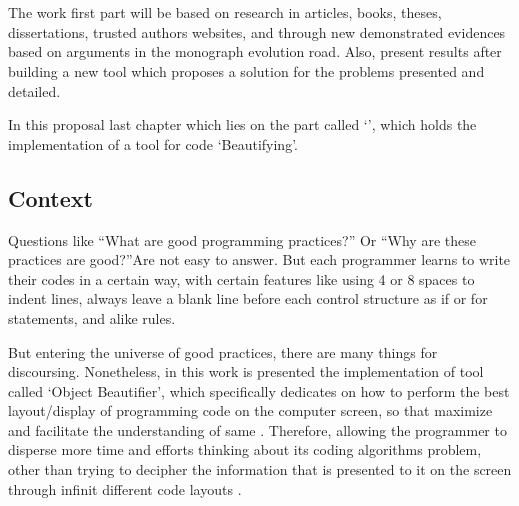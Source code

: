 

%


\chapter{}

    The work first part will be based on research in
    articles, books, theses, dissertations, trusted authors websites,
    and through new demonstrated evidences based on arguments
    in the monograph evolution road.
    Also, present results after building a new tool
    which proposes a solution for the problems presented and detailed.

    In this proposal last chapter which lies on the part
    called `', which holds the implementation of a
    tool for code `Beautifying'.



    \section{Context}

    Questions like ``What are good programming practices?'' Or ``Why are these
    practices are good?''Are not easy to answer. But each programmer learns to
    write their codes in a certain way, with certain features like using 4 or 8
    spaces to indent lines, always leave a blank line before each control
    structure as if or for statements, and alike rules.
    \cite{naturalCodingConventions}

    But entering the universe of good practices, there are many things for
    discoursing. Nonetheless, in this work is presented the implementation of
    tool called `Object Beautifier', which specifically dedicates on how to
    perform the best layout/display of programming code on the computer screen,
    so that maximize and facilitate the understanding of same
    \cite{automaticSynthesis}.
    Therefore, allowing the programmer to disperse
    more time and efforts thinking about its coding algorithms problem,
    other than trying to decipher the information that is presented
    to it on the screen through infinit different code layouts
    \cite{usingVersionControlData}.

